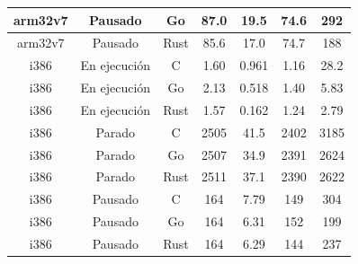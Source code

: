 \begin{table}[]
\begin{center}
\begin{tabular}{ |c|c|c|c|c|c|c| }
            \hline
            arm32v7             & Pausado          & Go             & 87.0
                                & 19.5             & 74.6           & 292              \\
            \hline
            arm32v7             & Pausado          & Rust           & 85.6
                                & 17.0             & 74.7           & 188              \\
            \hline
            i386                & En ejecución     & C              & 1.60
                                & 0.961            & 1.16           & 28.2             \\
            \hline
            i386                & En ejecución     & Go             & 2.13
                                & 0.518            & 1.40           & 5.83             \\
            \hline
            i386                & En ejecución     & Rust           & 1.57
                                & 0.162            & 1.24           & 2.79             \\
            \hline
            i386                & Parado           & C              & 2505
                                & 41.5             & 2402           & 3185             \\
            \hline
            i386                & Parado           & Go             & 2507
                                & 34.9             & 2391           & 2624             \\
            \hline
            i386                & Parado           & Rust           & 2511
                                & 37.1             & 2390           & 2622             \\
            \hline
            i386                & Pausado          & C              & 164
                                & 7.79             & 149            & 304              \\
            \hline
            i386                & Pausado          & Go             & 164
                                & 6.31             & 152            & 199              \\
            \hline
            i386                & Pausado          & Rust           & 164
                                & 6.29             & 144            & 237              \\
            \hline
        \end{tabular}
    \end{center}
\end{table}

